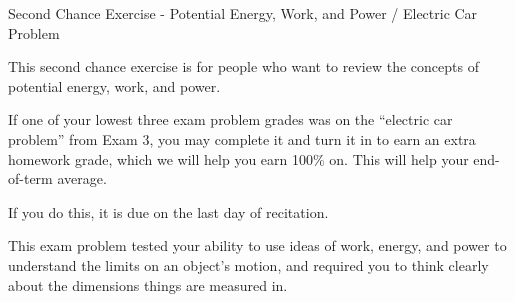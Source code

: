 \documentclass[12pt]{article}
\begin{document}
\begin{center}
\Large
\sc Second Chance Exercise - Potential Energy, Work, and Power / Electric Car Problem \rm





\normalsize
This second chance exercise is for people who want to review the concepts of potential energy, work, and power.

If one of your lowest three exam problem grades was on the ``electric car problem'' from Exam 3, you may complete it and turn it in to earn an extra homework grade, which we will help you earn 100\% on. This will help your end-of-term average.

If you do this, it is due on the last day of recitation.

\end{center}

\vspace{1.5in}

This exam problem tested your ability to use ideas of work, energy, and power to understand the limits on an object's motion, and required you to think clearly about the dimensions things are measured in.
\end{document}
